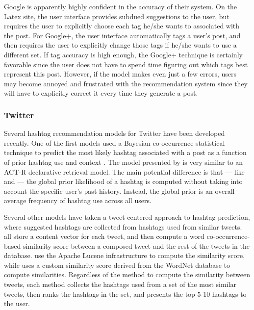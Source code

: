 \documentclass[man,floatsintext,donotrepeattitle]{apa6}
\begin{document}
Google is apparently highly confident in the accuracy of their system.
On the Latex site, the user interface provides subdued suggestions to the user, but requires the user to explicitly choose each tag he/she wants to associated with the post.
For Google+, the user interface automatically tags a user's post, and then requires the user to explicitly change those tags if he/she wants to use a different set.
If tag accuracy is high enough, the Google+ technique is certainly favorable since the user does not have to spend time figuring out which tags best represent this post.
However, if the model makes even just a few errors, users may become annoyed and frustrated with the recommendation system since they will have to explicitly correct it every time they generate a post.

\subsubsection{Twitter}

Several hashtag recommendation models for Twitter have been developed recently.
One of the first models used a Bayesian co-occurrence statistical technique to predict the most likely hashtag associated with a post as a function of prior hashtag use and context \parencite{Mazzia2009}.
The model presented by \textcite{Mazzia2009} is very similar to an ACT-R declarative retrieval model.
The main potential difference is that --- like \textcite{Kuo2011} and \textcite{Stanley2013} --- the global prior likelihood of a hashtag is computed without taking into account the specific user's past history.
Instead, the global prior is an overall average frequency of hashtag use across all users.

Several other models have taken a tweet-centered approach to hashtag prediction, where suggested hashtags are collected from hashtags used from similar tweets.
\textcites{Li2011, Zangerle2011, Kywe2012} all store a content vector for each tweet, and then compute a word co-occurrence-based similarity score between a composed tweet and the rest of the tweets in the database.
\textcites{Zangerle2011, Kywe2012} use the Apache Lucene infrastructure to compute the similarity score, while \textcite{Li2011} uses a custom similarity score derived from the WordNet database to compute similarities.
Regardless of the method to compute the similarity between tweets,
each method collects the hashtags used from a set of the most similar tweets, then ranks the hashtags in the set, and presents the top 5-10 hashtags to the user.
\end{document}
